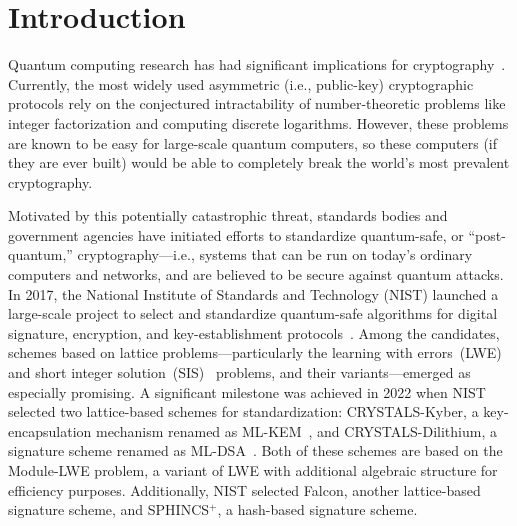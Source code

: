\section{Introduction}%
\label{sec:introduction}

Quantum computing research has had significant implications for cryptography~\cite{You_2005, Kelly_2015}.
Currently, the most widely used asymmetric (i.e., public-key) cryptographic protocols rely on the conjectured intractability of number-theoretic problems like integer factorization and computing discrete logarithms.
However, these problems are known to be easy for large-scale quantum computers, so these computers (if they are ever built) would be able to completely break the world's most prevalent cryptography.

Motivated by this potentially catastrophic threat, standards bodies and government agencies have initiated efforts to standardize quantum-safe, or ``post-quantum,'' cryptography---i.e., systems that can be run on today's ordinary computers and networks, and are believed to be secure against quantum attacks.
In 2017, the National Institute of Standards and Technology (NIST) launched a large-scale project to select and standardize quantum-safe algorithms for digital signature, encryption, and key-establishment protocols~\cite{NIST17}.
Among the candidates, schemes based on lattice problems---particularly the learning with errors~(LWE)~\cite{Reg09} and short integer solution~(SIS)~\cite{STOC:Ajtai96} problems, and their variants---emerged as especially promising.
A significant milestone was achieved in 2022 when NIST selected two lattice-based schemes for standardization: CRYSTALS-Kyber, a key-encapsulation mechanism renamed as ML-KEM~\cite{MLKEM}, and CRYSTALS-Dilithium, a signature scheme renamed as ML-DSA~\cite{MLDSA}.
Both of these schemes are based on the Module-LWE problem, a variant of LWE with additional algebraic structure for efficiency purposes.
Additionally, NIST selected Falcon, another lattice-based signature scheme, and SPHINCS$^+$, a hash-based signature scheme.

